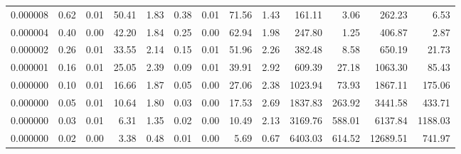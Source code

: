 \begin{tabular}{lrrrrrrrrrrrr}
0.000008 & 0.62 & 0.01 & 50.41 & 1.83 & 0.38 & 0.01 & 71.56 & 1.43 & 161.11 & 3.06 & 262.23 & 6.53 \\
0.000004 & 0.40 & 0.00 & 42.20 & 1.84 & 0.25 & 0.00 & 62.94 & 1.98 & 247.80 & 1.25 & 406.87 & 2.87 \\
0.000002 & 0.26 & 0.01 & 33.55 & 2.14 & 0.15 & 0.01 & 51.96 & 2.26 & 382.48 & 8.58 & 650.19 & 21.73 \\
0.000001 & 0.16 & 0.01 & 25.05 & 2.39 & 0.09 & 0.01 & 39.91 & 2.92 & 609.39 & 27.18 & 1063.30 & 85.43 \\
0.000000 & 0.10 & 0.01 & 16.66 & 1.87 & 0.05 & 0.00 & 27.06 & 2.38 & 1023.94 & 73.93 & 1867.11 & 175.06 \\
0.000000 & 0.05 & 0.01 & 10.64 & 1.80 & 0.03 & 0.00 & 17.53 & 2.69 & 1837.83 & 263.92 & 3441.58 & 433.71 \\
0.000000 & 0.03 & 0.01 & 6.31 & 1.35 & 0.02 & 0.00 & 10.49 & 2.13 & 3169.76 & 588.01 & 6137.84 & 1188.03 \\
0.000000 & 0.02 & 0.00 & 3.38 & 0.48 & 0.01 & 0.00 & 5.69 & 0.67 & 6403.03 & 614.52 & 12689.51 & 741.97 \\
\bottomrule
\end{tabular}
